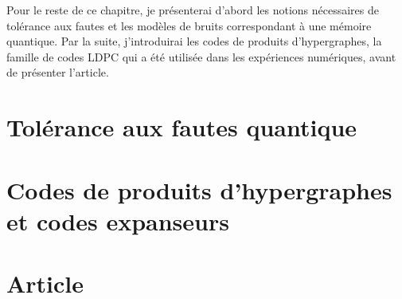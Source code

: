 Pour le reste de ce chapitre,
je présenterai d'abord les notions nécessaires de tolérance aux fautes et les modèles 
de bruits correspondant à une mémoire quantique.
Par la suite,
j'introduirai les codes de produits d'hypergraphes,
la famille de codes LDPC qui a été utilisée dans les expériences numériques,
avant de présenter l'article.

\section{Tolérance aux fautes quantique}

\section{Codes de produits d'hypergraphes et codes expanseurs}

\section{Article}



